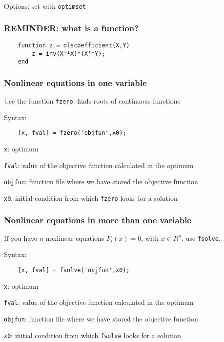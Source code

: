 \documentclass[show notes]{beamer}%
\begin{document}
{\begin{frame}[fragile]
Options: set with \texttt{optimset}

\end{frame}


\begin{frame}[fragile]
\frametitle{REMINDER: what is a function?}


\begin{lstlisting}
    function z = olscoefficient(X,Y)    
    	z = inv(X'*X)*(X'*Y);
    end
\end{lstlisting}


\end{frame}




\begin{frame}[fragile]
\frametitle{Nonlinear equations in one variable}
Use the function \texttt{fzero}: finds roots of continuous functions

Syntax:

\begin{lstlisting}
    [x, fval] = fzero('objfun',x0);
\end{lstlisting}

\texttt{x}: optimum

\texttt{fval}: value of the objective function calculated in the optimum

\texttt{objfun}: function file where we have stored the objective function

\texttt{x0}: initial condition from which \texttt{fzero} looks for a solution


\end{frame}



\begin{frame}[fragile]
\frametitle{Nonlinear equations in more than one variable}

If you have $n$ nonlinear equations $F_i (x) = 0$, with $x \in R^n$, use \texttt{fsolve}.

Syntax:

\begin{lstlisting}
    [x, fval] = fsolve('objfun',x0);
\end{lstlisting}

\texttt{x}: optimum

\texttt{fval}: value of the objective function calculated in the optimum

\texttt{objfun}: function file where we have stored the objective function

\texttt{x0}: initial condition from which \texttt{fsolve} looks for a solution


\end{frame}}
\end{document}
